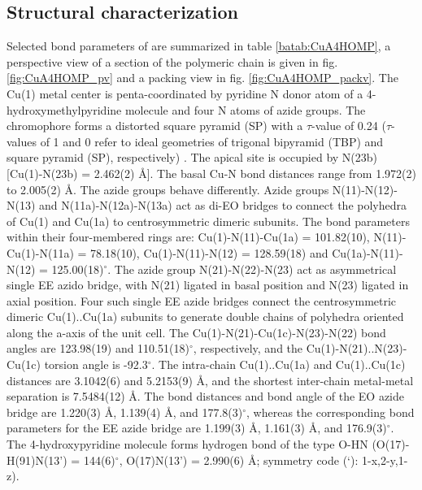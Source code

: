 \subsection{Structural characterization}
 Selected bond parameters of  are summarized in table \ref{batab:CuA4HOMP}, a perspective view of a section of the polymeric chain is given in fig. \ref{fig:CuA4HOMP_pv} and a packing view in fig. \ref{fig:CuA4HOMP_packv}. The Cu(1) metal center is penta-coordinated by pyridine N donor atom of a 4-hydroxymethylpyridine molecule and four N atoms of azide groups. The  chromophore forms a distorted square pyramid (SP) with a $\tau$-value of 0.24 ($\tau$-values of 1 and 0 refer to ideal geometries of trigonal bipyramid (TBP) and square pyramid (SP), respectively) \cite{addison}. The apical site is occupied by N(23b) [Cu(1)-N(23b) = 2.462(2) \AA]. The basal Cu-N bond distances range from 1.972(2) to 2.005(2) \AA. The azide groups behave differently. Azide groups N(11)-N(12)-N(13) and N(11a)-N(12a)-N(13a) act as di-EO bridges to connect the polyhedra of Cu(1) and Cu(1a) to centrosymmetric dimeric subunits. The bond parameters within their four-membered  rings are: Cu(1)-N(11)-Cu(1a) = 101.82(10), N(11)-Cu(1)-N(11a) = 78.18(10), Cu(1)-N(11)-N(12) =  128.59(18) and Cu(1a)-N(11)-N(12) = 125.00(18)$^\circ$. The azide group N(21)-N(22)-N(23) act as asymmetrical single EE azido bridge, with N(21) ligated in basal position and N(23) ligated in axial position. Four such single EE azide bridges connect the centrosymmetric dimeric Cu(1)..Cu(1a) subunits to generate double chains of polyhedra oriented along the a-axis of the unit cell. The Cu(1)-N(21)-Cu(1c)-N(23)-N(22) bond angles are 123.98(19) and 110.51(18)$^\circ$, respectively, and the Cu(1)-N(21)..N(23)-Cu(1c) torsion angle is -92.3$^\circ$. The intra-chain Cu(1)..Cu(1a) and Cu(1)..Cu(1c) distances are 3.1042(6) and 5.2153(9) \AA, and the shortest inter-chain metal-metal separation is 7.5484(12) \AA. The bond distances and bond angle of the EO azide bridge are 1.220(3) \AA, 1.139(4) \AA, and 177.8(3)$^\circ$, whereas the corresponding bond parameters for the EE azide bridge are 1.199(3) \AA, 1.161(3) \AA, and 176.9(3)$^\circ$. The 4-hydroxypyridine molecule forms hydrogen bond of  the type O-H\ce{***}N (O(17)-H(91)\ce{***}N(13’)  = 144(6)$^\circ$, O(17)\ce{***}N(13’) = 2.990(6) \AA; symmetry code (‘): 1-x,2-y,1-z).



